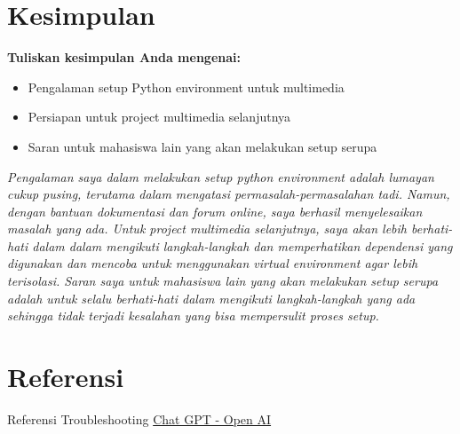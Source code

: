 \documentclass[11pt,a4paper]{article}
\begin{document}
\section{Kesimpulan}
\textbf{Tuliskan kesimpulan Anda mengenai:}
\begin{itemize}
    \item Pengalaman setup Python environment untuk multimedia
    \item Persiapan untuk project multimedia selanjutnya
    \item Saran untuk mahasiswa lain yang akan melakukan setup serupa
\end{itemize}

\textit{Pengalaman saya dalam melakukan setup python environment adalah lumayan cukup pusing, terutama dalam mengatasi permasalah-permasalahan tadi. Namun, dengan bantuan dokumentasi dan forum online, saya berhasil menyelesaikan masalah yang ada. Untuk project multimedia selanjutnya, saya akan lebih berhati-hati dalam dalam mengikuti langkah-langkah dan memperhatikan dependensi yang digunakan dan mencoba untuk menggunakan virtual environment agar lebih terisolasi. Saran saya untuk mahasiswa lain yang akan melakukan setup serupa adalah untuk selalu berhati-hati dalam mengikuti langkah-langkah yang ada sehingga tidak terjadi kesalahan yang bisa mempersulit proses setup.}

\section{Referensi}
Referensi Troubleshooting \href{https://chatgpt.com/share/68b1b4fe-8fac-800d-b4e2-c8d4d330802c}{Chat GPT - Open AI}

\newpage


\end{document}
